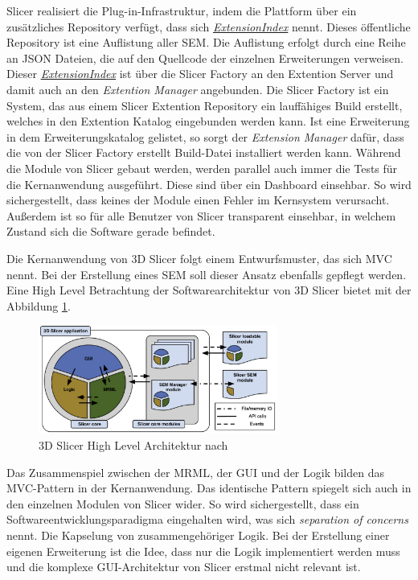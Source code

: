 Slicer realisiert die Plug-in-Infrastruktur, indem die Plattform über ein
zusätzliches Repository verfügt, dass sich \href{https://github.com/Slicer/ExtensionsIndex?tab=readme-ov-file}{\textit{ExtensionIndex}}
nennt. Dieses öffentliche Repository ist eine Auflistung aller \ac{SEM}. Die
Auflistung erfolgt durch eine Reihe an \ac{JSON} Dateien, die auf den Quellcode
der einzelnen Erweiterungen verweisen. Dieser \href{https://github.com/Slicer/ExtensionsIndex?tab=readme-ov-file}{\textit{ExtensionIndex}}
ist über die Slicer Factory an den Extention Server und damit auch an den \textit{Extention
Manager} angebunden. Die Slicer Factory ist ein System, das aus einem Slicer
Extention Repository ein lauffähiges Build erstellt, welches in den Extention Katalog
eingebunden werden kann. Ist eine Erweiterung in dem Erweiterungskatalog
gelistet, so sorgt der \textit{Extension Manager} dafür, dass die von der Slicer
Factory erstellt Build-Datei installiert werden kann. Während die Module von
Slicer gebaut werden, werden parallel auch immer die Tests für die Kernanwendung
ausgeführt. Diese sind über ein Dashboard einsehbar. So wird sichergestellt,
dass keines der Module einen Fehler im Kernsystem verursacht. Außerdem ist so für
alle Benutzer von Slicer transparent einsehbar, in welchem Zustand sich die
Software gerade befindet.

Die Kernanwendung von 3D Slicer folgt einem Entwurfsmuster, das sich \ac{MVC}
nennt. Bei der Erstellung eines \ac{SEM} soll dieser Ansatz ebenfalls gepflegt
werden. Eine High Level Betrachtung der Softwarearchitektur von 3D Slicer bietet
\cite[S.~1332]{fedorov2012slicer} mit der Abbildung \ref{fig:3d_slicer_architektur}.

\begin{figure}[h]
	\centering
	\includegraphics[width=0.7\textwidth]{img/3d_slicer_architektur.jpg}
	\caption{3D Slicer High Level Architektur nach \citet[S.~1332]{fedorov2012slicer}}
	\label{fig:3d_slicer_architektur}
\end{figure}

Das Zusammenspiel zwischen der \ac{MRML}, der \ac{GUI} und der Logik bilden das MVC-Pattern
in der Kernanwendung. Das identische Pattern spiegelt sich auch in den einzelnen
Modulen von Slicer wider. So wird sichergestellt, dass ein
Softwareentwicklungsparadigma eingehalten wird, was sich \textit{separation of
concerns} nennt. Die Kapselung von zusammengehöriger Logik. Bei der Erstellung
einer eigenen Erweiterung ist die Idee, dass nur die Logik implementiert werden muss
und die komplexe \ac{GUI}-Architektur von Slicer erstmal nicht relevant ist.

